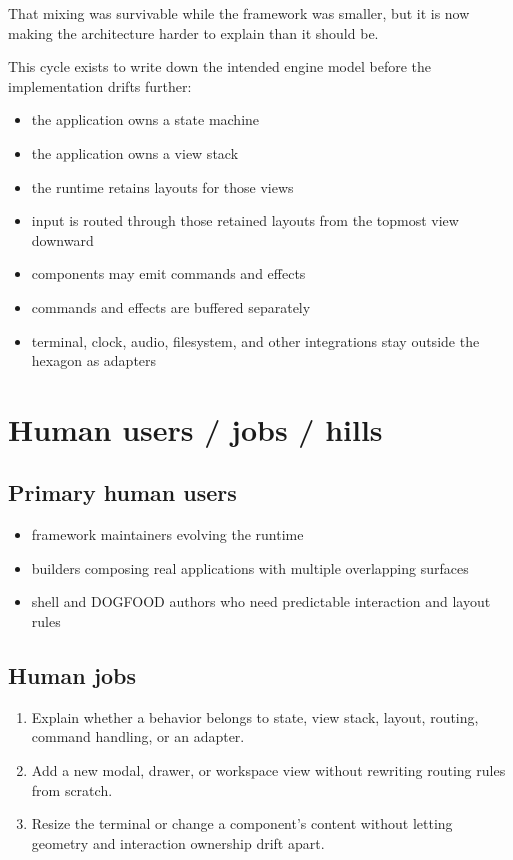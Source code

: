 That mixing was survivable while the framework was smaller, but it is now making the architecture harder to explain than it should be.

This cycle exists to write down the intended engine model before the implementation drifts further:

\begin{itemize}
\tightlist
\item
  the application owns a state machine
\item
  the application owns a view stack
\item
  the runtime retains layouts for those views
\item
  input is routed through those retained layouts from the topmost view downward
\item
  components may emit commands and effects
\item
  commands and effects are buffered separately
\item
  terminal, clock, audio, filesystem, and other integrations stay outside the hexagon as adapters
\end{itemize}

\section{Human users / jobs / hills}\label{record-149-human-users-jobs-hills}

\subsection{Primary human users}\label{record-149-primary-human-users}

\begin{itemize}
\tightlist
\item
  framework maintainers evolving the runtime
\item
  builders composing real applications with multiple overlapping surfaces
\item
  shell and DOGFOOD authors who need predictable interaction and layout rules
\end{itemize}

\subsection{Human jobs}\label{record-149-human-jobs}

\begin{enumerate}
\def\labelenumi{\arabic{enumi}.}
\tightlist
\item
  Explain whether a behavior belongs to state, view stack, layout, routing, command handling, or an adapter.
\item
  Add a new modal, drawer, or workspace view without rewriting routing rules from scratch.
\item
  Resize the terminal or change a component's content without letting geometry and interaction ownership drift apart.
\end{enumerate}

